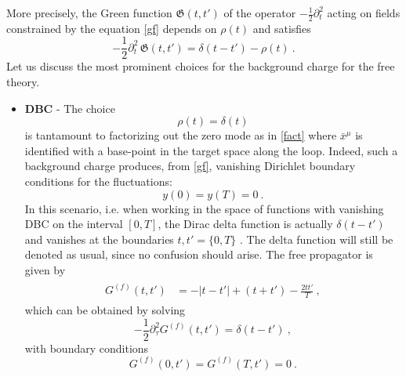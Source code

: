 \documentclass[12pt,a4paper]{article}
\numberwithin{equation}{section}
\numberwithin{equation}{section}
\begin{document}
More precisely, the Green function $\mathfrak{G}(t,t')$ of the operator $-\tfrac12\partial^2_t$ acting on fields constrained by the equation \eqref{gf} depends on $\rho(t)$ and satisfies
\begin{equation} \label{MS}
{-\frac12\partial_t^2 \, \mathfrak{G}(t,t')=\delta(t-t')-\rho(t)}\ .
\end{equation}
Let us discuss the most prominent choices for the background charge for the {free} theory.

\begin{itemize}
 \item \textbf{DBC} - The choice 
 \begin{equation}
 \rho(t)=\delta(t)
 \end{equation}
 is tantamount to factorizing out the zero mode as in \eqref{fact} where $\bar{x}^\mu$ is identified with a base-point in the target space along the loop. Indeed, such a background charge produces, from \eqref{gf}, vanishing Dirichlet boundary conditions for the fluctuations: 
 \begin{equation}
 y(0)=y(T)=0\ .
 \end{equation}
 In this scenario, i.e. when working in the space of functions with vanishing DBC on the interval $[0,T]$, the Dirac delta function is actually $\delta(t-t')$ and vanishes at the boundaries $t,t'=\lbrace 0, T\rbrace $ \cite{Bastianelli:2002qw}. The delta function will still be denoted as usual, since no confusion should arise. The free propagator is given by
 \begin{align}
 \begin{split} \label{freeop}
 G^{(f)}(t,t')&=-|t-t'|+\left(t+t'\right)-\frac{2t t'}{T}\ ,
 \end{split}
 \end{align}
 which can be obtained by solving
 \begin{equation}
 -\frac12\partial_\tau^2G^{(f)}(t,t')=\delta(t-t')\ ,
 \end{equation}
 with boundary conditions
 \begin{equation}
 G^{(f)}(0,t')= G^{(f)}(T,t')=0\ .
 \end{equation}
 

\end{itemize}
\end{document}
